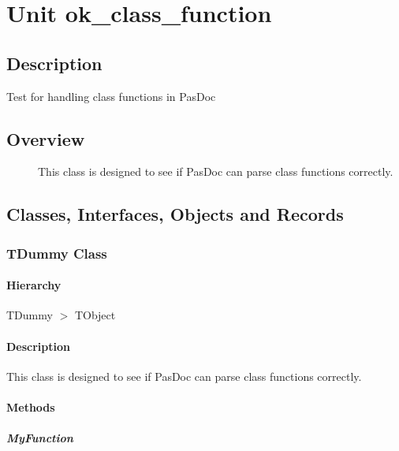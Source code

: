 \documentclass{report}
\begin{document}
\newlength{\tmplength}
\chapter{Unit ok{\_}class{\_}function}
\section{Description}
Test for handling class functions in PasDoc
\section{Overview}
\begin{description}
\item[\texttt{\begin{ttfamily}TDummy\end{ttfamily} Class}]This class is designed to see if PasDoc can parse class functions correctly.
\end{description}
\section{Classes, Interfaces, Objects and Records}
\subsection*{TDummy Class}
\subsubsection*{\large{\textbf{Hierarchy}}\normalsize\hspace{1ex}\hfill}
TDummy {$>$} TObject
\subsubsection*{\large{\textbf{Description}}\normalsize\hspace{1ex}\hfill}
This class is designed to see if PasDoc can parse class functions correctly.\subsubsection*{\large{\textbf{Methods}}\normalsize\hspace{1ex}\hfill}
\paragraph*{MyFunction}\hspace*{\fill}
\end{document}
